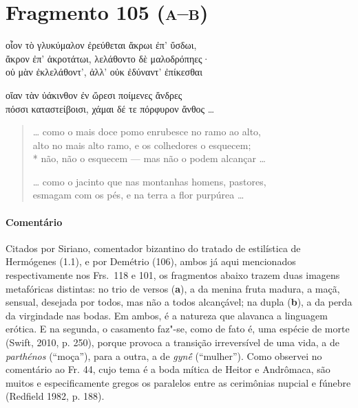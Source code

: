 {\pagebreak
\section{Fragmento 105 (\textsc{a--b})}

\begin{gkverse}
οἶον τὸ γλυκύμαλον ἐρεύθεται ἄκρωι ἐπ’ ὔσδωι,\\
ἄκρον ἐπ’ ἀκροτάτωι, λελάθοντο δὲ μαλοδρόπηες·\\
οὐ μὰν ἐκλελάθοντ’, ἀλλ’ οὐκ ἐδύναντ’ ἐπίκεσθαι

\ast\quad\ast\quad\ast

οἴαν τὰν ὐάκινθον ἐν ὤρεσι ποίμενες ἄνδρες\\
πόσσι καταστείβοισι, χάμαι δέ τε πόρφυρον ἄνθος \ldots{}

\end{gkverse}

\begin{verse}
\ldots{} como o mais doce pomo enrubesce no ramo ao alto,\\
alto no mais alto ramo, e os colhedores o esquecem;\\*
não, não o esquecem --- mas não o podem alcançar \ldots{}

\ast\quad\ast\quad\ast

\ldots{} como o jacinto que nas montanhas homens, pastores,\\
esmagam com os pés, e na terra a flor purpúrea \ldots{}
\end{verse}

{\paragraph{Comentário} Citados por Siriano, comentador bizantino do tratado de estilística de
Hermógenes (1.1), e por Demétrio (106), ambos já aqui mencionados respectivamente nos Frs.~118 e 101, os fragmentos abaixo trazem duas imagens metafóricas distintas: no trio de versos (\textbf{a}), a da menina fruta madura, a maçã, sensual, desejada por todos,
mas não a todos alcançável; na dupla (\textbf{b}), a da perda da virgindade nas bodas.
Em ambos, é a natureza que alavanca a linguagem erótica.
E na segunda, o casamento faz"-se, como de fato é, uma espécie de morte (Swift, 2010, p. 250), porque provoca a transição irreversível de uma vida, a de \textit{parthénos} (``moça''), para a outra, a de \textit{gynḗ } (``mulher''). Como observei no comentário ao Fr. 44, cujo tema é a boda mítica de Heitor e Andrômaca, são muitos e especificamente gregos os paralelos entre as cerimônias nupcial e fúnebre (Redfield 1982, p. 188).}


}
